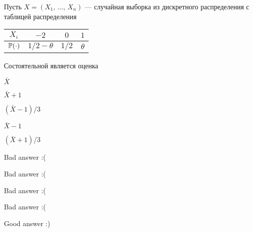 
\begin{question}
Пусть \(X = (X_1, \, \ldots, \, X_n)\) --- случайная выборка из
дискретного распределения с таблицей распределения

\vspace{5mm}
\begin{tabular}{cccc}
\toprule
$X_i$    & $-2$     & $0$   & $1$  \\
\midrule
$\P(\cdot)$        & $1/2 - \theta$      & $1/2$    & $\theta$  \\
\bottomrule
\end{tabular}
\vspace{5mm}

Состоятельной является оценка
\begin{answerlist}
  \item \(\bar{X}\)
  \item \(\bar{X} + 1\)
  \item \((\bar{X} - 1) / 3\)
  \item \(\bar{X} - 1\)
  \item \((\bar{X} + 1) / 3\)
\end{answerlist}
\end{question}

\begin{solution}
\begin{answerlist}
  \item Bad answer :(
  \item Bad answer :(
  \item Bad answer :(
  \item Bad answer :(
  \item Good answer :)
\end{answerlist}
\end{solution}

